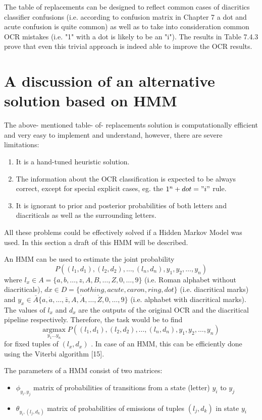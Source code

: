 \documentclass[12pt,a4paper]{report}
\begin{document}
The table of replacements can be designed to reflect common cases of diacritics classifier confusions (i.e. according to confusion matrix in Chapter 7 a dot and acute confusion is quite common) as well as to take into consideration common OCR mistakes (i.e. "1" with a dot is likely to be an "i"). The results in Table 7.4.3 prove that even this trivial approach is indeed able to improve the OCR results.

\section{A discussion of an alternative solution based on HMM}
The above- mentioned table- of- replacements solution is computationally efficient and very easy to implement and understand, however, there are severe limitations:
\begin{enumerate}
    \item It is a hand-tuned heuristic solution.
    \item The information about the OCR classification is expected to be always correct, except for special explicit cases, eg. the $1^{n} + dot = "i"$ rule.
    \item It is ignorant to prior and posterior probabilities of both letters and diacriticals as well as the surrounding letters.
\end{enumerate}

All these problems could be effectively solved if a Hidden Markov Model was used. In this section a draft of this HMM will be described.

An HMM can be used to estimate the joint probability
\[
P((l_1,d_1),(l_2,d_2),\ldots ,(l_n,d_n),y_1,y_2,\ldots ,y_n)
\]
where $l_{x}\in A = \{a,b,\ldots ,z,A,B,\ldots ,Z,0,\ldots ,9\}$ (i.e. Roman alphabet without diacriticals), $d x\in D = \{nothing,acute,caron,ring,dot\}$ (i.e. diacritical marks) and $y_{x}\in \bar{A}\{a,\dot{a},\ldots ,\bar{z},A,\dot{A},\ldots ,\dot{Z},0,\ldots ,9\}$ (i.e. alphabet with diacritical marks). The values of $l_{x}$ and $d_{x}$ are the outputs of the original OCR and the diacritical pipeline respectively. Therefore, the task would be to find
\[
\underset {y_1\dots y_n}{\mathrm{argmax}}\; P((l_1,d_1),(l_2,d_2),\dots ,(l_n,d_n),y_1,y_2,\dots ,y_n)
\]
for fixed tuples of $(l_{x},d_{x})$ . In case of an HMM, this can be efficiently done using the Viterbi algorithm [15].

The parameters of a HMM consist of two matrices:
\begin{itemize}
    \item $\phi_{y_i,y_j}$ matrix of probabilities of transitions from a state (letter) $y_{i}$ to $y_{j}$
    \item $\theta_{y_i,(l_j,d_k)}$ matrix of probabilities of emissions of tuples $(l_j,d_k)$ in state $y_{i}$
\end{itemize}
\end{document}

